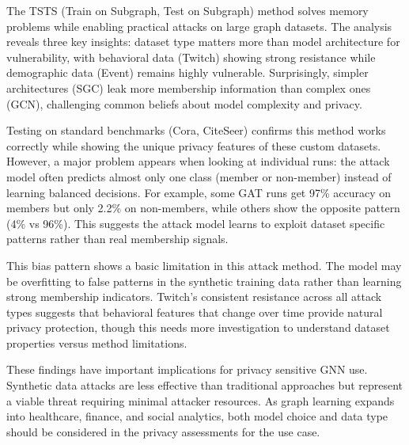 \documentclass{article}
\begin{document}
The TSTS (Train on Subgraph, Test on Subgraph) method solves memory problems while enabling practical attacks on large graph datasets. The analysis reveals three key insights: dataset type matters more than model architecture for vulnerability, with behavioral data (Twitch) showing strong resistance while demographic data (Event) remains highly vulnerable. Surprisingly, simpler architectures (SGC) leak more membership information than complex ones (GCN), challenging common beliefs about model complexity and privacy.

Testing on standard benchmarks (Cora, CiteSeer) confirms this method works correctly while showing the unique privacy features of these custom datasets. However, a major problem appears when looking at individual runs: the attack model often predicts almost only one class (member or non-member) instead of learning balanced decisions. For example, some GAT runs get 97\% accuracy on members but only 2.2\% on non-members, while others show the opposite pattern (4\% vs 96\%). This suggests the attack model learns to exploit dataset specific patterns rather than real membership signals.

This bias pattern shows a basic limitation in this attack method. The model may be overfitting to false patterns in the synthetic training data rather than learning strong membership indicators. Twitch's consistent resistance across all attack types suggests that behavioral features that change over time provide natural privacy protection, though this needs more investigation to understand dataset properties versus method limitations.

These findings have important implications for privacy sensitive GNN use. Synthetic data attacks are less effective than traditional approaches but represent a viable threat requiring minimal attacker resources. As graph learning expands into healthcare, finance, and social analytics, both model choice and data type should be considered  in the privacy assessments for the use case.




\end{document}
